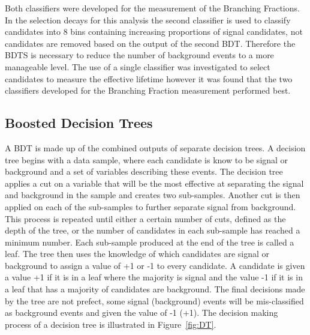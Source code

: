 Both classifiers were developed for the measurement of the \bmumu Branching Fractions. In the selection \bsmumu decays for this analysis the second classifier is used to classify candidates into 8 bins containing increasing proportions of signal candidates, not candidates are removed based on the output of the second BDT. Therefore the BDTS is necessary to reduce the number of background events to a more manageable level. The use of a single classifier was investigated to select candidates to measure the \bsmumu effective lifetime however it was found that the two classifiers developed for the Branching Fraction measurement performed best. 

\subsection{Boosted Decision Trees}
\label{sec:GeneralBDT}
A BDT is made up of the combined outputs of separate decision trees. A decision tree begins with a data sample, where each candidate is know to be signal or background and a set of variables describing these events. The decision tree applies a cut on a variable that will be the most effective at separating the signal and background in the sample and creates two sub-samples. Another cut is then applied on each of the sub-samples to further separate signal from background. This process is repeated until either a certain number of cuts, defined as the depth of the tree, or the number of candidates in each sub-sample has reached a minimum number. Each sub-sample produced at the end of the tree is called a leaf. The tree then uses the knowledge of which candidates are signal or background to assign a value of +1 or -1 to every candidate. A candidate is given a value +1 if it is in a leaf where the majority is signal and the value -1 if it is in a leaf that has a majority of candidates are background. The final decisions made by the tree are not prefect, some signal (background) events will be mis-classified as background events and given the value of -1 (+1). The decision making process of a decision tree is illustrated in Figure~\ref{fig:DT}.

